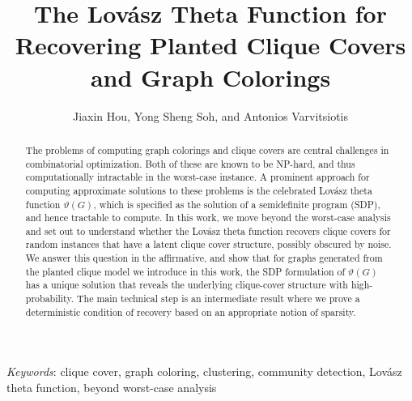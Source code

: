 \documentclass[11pt,letterpaper]{article}
\title{The Lov\'asz Theta Function for Recovering Planted Clique Covers and Graph Colorings}
\author{Jiaxin Hou, Yong Sheng Soh, and Antonios Varvitsiotis}
\begin{document}
\maketitle

\begin{abstract}
The problems of computing graph colorings and clique covers are central challenges in combinatorial optimization.  Both of these are known to be NP-hard, and thus computationally intractable in the worst-case instance.  A prominent approach for computing approximate solutions to these problems is the celebrated Lov\'asz theta function $\vartheta(G)$, which is specified as the solution of a semidefinite program (SDP), and hence tractable to compute.  In this work, we move beyond the worst-case analysis and set out to understand whether the Lov\'asz theta function recovers clique covers for random instances  that have  a latent clique cover structure, possibly obscured by noise.  We answer this question in the affirmative, and show that  for graphs generated from the planted clique model  we introduce in this work, the SDP formulation of $\vartheta(G)$ has a unique solution that reveals  the underlying clique-cover structure  with high-probability.  The main technical step is an intermediate  result  where we prove a deterministic condition of recovery based on an appropriate notion of sparsity.  
\end{abstract}

\noindent \emph{Keywords}: clique cover, graph coloring,  clustering, community detection, Lov\'asz theta function, beyond worst-case analysis















%
\end{document}
